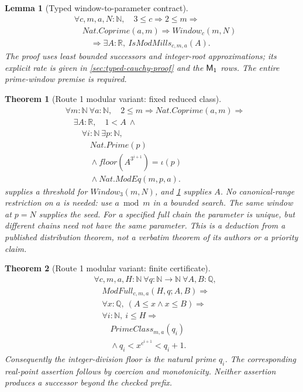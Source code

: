 \documentclass[11pt,reqno]{amsart}
\makeatletter
\newcommand{\N}{\mathbb N}
\newcommand{\Q}{\mathbb Q}
\newcommand{\R}{\mathbb R}
\theoremstyle{blueplain}
\newtheorem{theorem}{Theorem}[section]
\newtheorem{lemma}{Lemma}[section]
\newcounter{type}
\newcounter{asser}
\newcommand{\defref}[1]{\hyperref[#1]{Definition~\ref*{#1}}}
\numberwithin{equation}{section}
\DeclareRobustCommand{\defref}[1]{%
  \hyperlink{def:#1}{\ensuremath{\csname PredicateName@#1\endcsname}}}
\DeclareRobustCommand{\proofref}[2]{\hyperlink{proof:#1}{\ensuremath{#2}}}
\def\defref#1{#1}%
\def\proofref#1#2{#2}%
\def\hyperlink#1#2{#2}}
\makeatother
\begin{document}
\begin{lemma}[Typed window-to-parameter contract]\label{lem:typed-window-limit}
\[
\begin{aligned}
&\forall c,m,a,N:\N,\quad 3\le c\Rightarrow2\le m\Rightarrow\\
&\quad\defref{Nat.Coprime}(a,m)\Rightarrow\defref{Window}_c(m,N)\\
&\qquad\Rightarrow\exists A:\R,\ \defref{IsModMills}_{c,m,a}(A).
\end{aligned}
\]
The proof uses least bounded successors and integer-root approximations;
its explicit rate is given in \cref{sec:typed-cauchy-proof} and the
$\proofref{M-1}{\textsf M_1}$ rows. The entire prime-window premise is required.
\end{lemma}

\begin{theorem}[Route 1 modular variant: fixed reduced class]\label{thm:mod-global}
\[
\begin{aligned}
&\forall m:\N\ \forall a:\N,\quad
2\le m\Rightarrow\defref{Nat.Coprime}(a,m)\Rightarrow\\
&\quad\exists A:\R,\quad1<A\ \wedge\\
&\qquad\forall i:\N\ \exists p:\N,\\
&\qquad\quad\defref{Nat.Prime}(p)\\
&\qquad\quad{}\wedge\defref{floor}(A^{3^{i+1}})=\iota(p)\\
&\qquad\quad{}\wedge\defref{Nat.ModEq}(m,p,a).
\end{aligned}
\]
 supplies a threshold for
$\defref{Window}_3(m,N)$, and \cref{lem:typed-window-limit} supplies $A$.
No canonical-range restriction on $a$ is needed: use $a\bmod m$ in a
bounded search. The same window at $p=N$ supplies the seed. For a specified
full chain the parameter is unique, but different chains need not have the
same parameter. This is a deduction from a published distribution theorem,
not a verbatim theorem of its authors or a priority claim.
\end{theorem}

\begin{theorem}[Route 1 modular variant: finite certificate]\label{thm:mod-finite}
\[
\begin{aligned}
&\forall c,m,a,H:\N\ \forall q:\N\to\N\ \forall A,B:\Q,\\
&\quad\defref{ModFull}_{c,m,a}(H,q;A,B)\Rightarrow\\
&\quad\forall x:\Q,\ (A\le x\wedge x\le B)\Rightarrow\\
&\quad\forall i:\N,\ i\le H\Rightarrow\\
&\qquad\defref{PrimeClass}_{m,a}(q_i)\\
&\qquad{}\wedge q_i<x^{c^{i+1}}<q_i+1.
\end{aligned}
\]
Consequently the integer-division floor is the natural prime $q_i$.
The corresponding real-point assertion follows by coercion and monotonicity.
Neither assertion produces a successor beyond the checked prefix.
\end{theorem}
\end{document}
